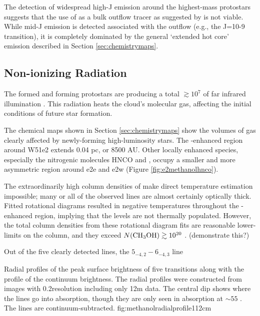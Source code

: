 \documentclass{aa}
\begin{document}
The detection of widespread high-J \methanol emission around the highest-mass
protostars suggests that the use of \methanol as a bulk outflow tracer as
suggested by \citet{Kristensen2015a} is not viable.  While mid-J \methanol
emission is detected associated with the outflow (e.g., the J=10-9 transition),
it is completely dominated by the general `extended hot core' emission
described in Section \ref{sec:chemistrymaps}.

\subsection{Non-ionizing Radiation}
\label{sec:nonionizingradiation}
The formed and forming protostars are producing a total $\gtrsim10^7$ \lsun of
far infrared illumination \citep{Ginsburg2016b}.  This radiation heats the
cloud's molecular gas, affecting the initial conditions of future star
formation.

The chemical maps shown in Section \ref{sec:chemistrymaps} show the volumes of
gas clearly affected by newly-forming high-luminosity stars.  The
\methanol-enhanced region around W51e2 extends 0.04 pc, or 8500 AU. Other
locally enhanced species, especially the nitrogenic molecules HNCO and
\formamide, occupy a smaller and more asymmetric region around e2e and e2w 
(Figure \ref{fig:e2methanolhnco}).

The extraordinarily high column densities of \methanol make direct temperature
estimation impossible; many or all of the observed \methanol lines are almost
certainly optically thick.  Fitted rotational diagrams resulted in negative
temperatures throughout the \methanol-enhanced region, implying that the levels
are not thermally populated.  However, the total column densities from these
rotational diagram fits are reasonable lower-limits on the column, and they
exceed $N(\textrm{CH}_3\textrm{OH})\gtrsim10^{20}$ \persc.
(demonstrate this?)

Out of the five clearly detected \methanol lines, the $5_{-4,2}-6_{-4,3}$
line

{Radial profiles of the peak surface brightness of five \methanol transitions
along with the profile of the continuum brightness.  The radial profiles were
constructed from images with 0.2\arcsec resolution including only 12m data.
The central dip shows where the lines go into absorption, though they are only
seen in absorption at $\sim55$ \kms.  The \methanol lines are
continuum-subtracted.}
{fig:methanolradialprofile}{1}{12cm}
\end{document}

